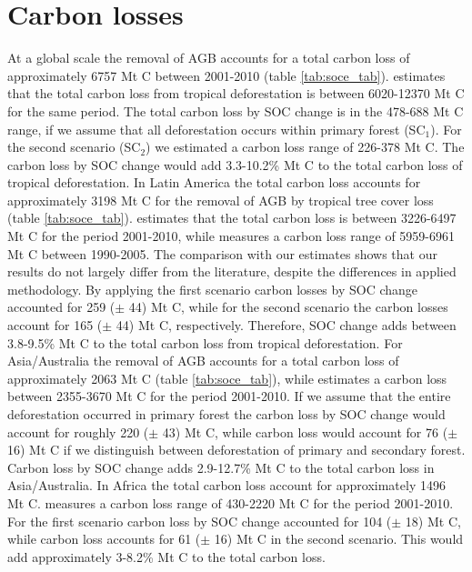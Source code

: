 	\section{Carbon losses}
	\label{sec:results_carbon_loss}
		At a global scale the removal of \ac{AGB} accounts for a total carbon loss of approximately 6757 Mt C between 2001-2010 (table \ref{tab:soce_tab}). \citet{Achard2014} estimates that the total carbon loss from tropical deforestation is between 6020-12370 Mt C for the same period. The total carbon loss by \ac{SOC} change is in the 478-688 Mt C range, if we assume that all deforestation occurs within primary forest (SC$_1$). For the second scenario (SC$_2$) we estimated a carbon loss range of 226-378 Mt C. The carbon loss by \ac{SOC} change would add 3.3-10.2\% Mt C to the total carbon loss of tropical deforestation. In Latin America the total carbon loss accounts for approximately 3198 Mt C for the removal of \ac{AGB} by tropical tree cover loss (table \ref{tab:soce_tab}). \citet{Achard2014} estimates that the total carbon loss is between 3226-6497 Mt C for the period 2001-2010, while \citet{Sy2015} measures a carbon loss range of 5959-6961 Mt C between 1990-2005. The comparison with our estimates shows that our results do not largely differ from the literature, despite the differences in applied methodology. By applying the first scenario carbon losses by \ac{SOC} change accounted for 259 ($\pm$ 44) Mt C, while for the second scenario the carbon losses account for 165 ($\pm$ 44) Mt C, respectively. Therefore, \ac{SOC} change adds between 3.8-9.5\% Mt C to the total carbon loss from tropical deforestation. For Asia/Australia the removal of \ac{AGB} accounts for a total carbon loss of approximately 2063 Mt C (table \ref{tab:soce_tab}), while \citet{Achard2014} estimates a carbon loss between 2355-3670 Mt C for the period 2001-2010. If we assume that the entire deforestation occurred in primary forest the carbon loss by \ac{SOC} change would account for roughly 220 ($\pm$ 43) Mt C, while carbon loss would account for 76 ($\pm$ 16) Mt C if we distinguish between deforestation of primary and secondary forest. Carbon loss by \ac{SOC} change adds 2.9-12.7\% Mt C to the total carbon loss in Asia/Australia. In Africa the total carbon loss account for approximately 1496 Mt C. \citet{Achard2014} measures a carbon loss range of 430-2220 Mt C for the period 2001-2010. For the first scenario carbon loss by \ac{SOC} change accounted for 104 ($\pm$ 18) Mt C, while carbon loss accounts for 61 ($\pm$ 16) Mt C in the second scenario. This would add approximately 3-8.2\% Mt C to the total carbon loss.
